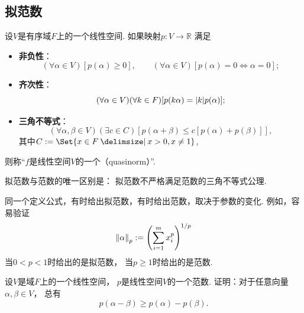 \subsection{拟范数}
\begin{definition}
设\(V\)是有序域\(F\)上的一个线性空间.
如果映射\(p\colon V \to \mathbb{R}\)
满足\begin{itemize}
	\item {\rm\bf 非负性}：\begin{equation*}
		(\forall \alpha \in V)
		[p(\alpha) \geq 0],
		\qquad
		(\forall \alpha \in V)
		[
			p(\alpha) = 0
			\iff
			\alpha = 0
		];
	\end{equation*}

	\item {\rm\bf 齐次性}：\begin{equation*}
		(\forall \alpha \in V)
		(\forall k \in F)
		[
			p(k \alpha) = \abs{k} p(\alpha)
		];
	\end{equation*}

	\item {\rm\bf 三角不等式}：\begin{equation*}
		(\forall \alpha,\beta \in V)
		(\exists c \in C)
		[
			p(\alpha+\beta) \leq c [p(\alpha) + p(\beta)]
		],
	\end{equation*}
	其中\(
		C
		\defeq
		\Set{
			x \in F
			\given
			x > 0,
			x \neq 1
		}
	\),
\end{itemize}
则称“\(f\)是线性空间\(V\)的一个（quasinorm）”.
\end{definition}

拟范数与范数的唯一区别是：
拟范数不严格满足范数的三角不等式公理.

\begin{example}
同一个定义公式，有时给出拟范数，有时给出范数，取决于参数的变化.
例如，容易验证\begin{equation*}
	\norm{\alpha}_p
	:=
	\left( \sum_{i=1}^m x_i^p \right)^{1/p}
\end{equation*}
当\(0 < p < 1\)时给出的是拟范数，
当\(p \geq 1\)时给出的是范数.
\end{example}

\begin{example}
设\(V\)是域\(F\)上的一个线性空间，
\(p\)是线性空间\(V\)的一个范数.
证明：对于任意向量\(\alpha,\beta \in V\)，
总有\begin{equation*}
	p(\alpha - \beta)
	\geq p(\alpha) - p(\beta).
\end{equation*}
\end{example}

